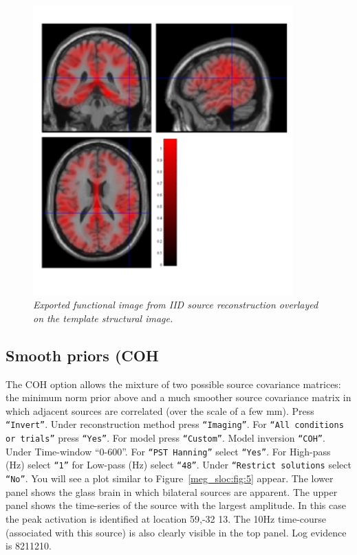 \begin{figure}
\begin{center}
\includegraphics[width=100mm]{meg_sloc/slide4}
\caption{\em Exported functional image from IID source reconstruction overlayed on the template structural image.\label{meg_sloc:fig:4}}
\end{center}
\end{figure}

\subsection{Smooth priors (COH}
The COH option allows the mixture of two possible source covariance matrices: the minimum norm prior above and a much smoother source covariance matrix in which adjacent sources are correlated (over the scale of a few mm). Press \texttt{``Invert''}. Under reconstruction method press \texttt{``Imaging''}. For \texttt{``All conditions or trials''} press \texttt{``Yes''}. For model press \texttt{``Custom''}. Model inversion \texttt{``COH''}. Under Time-window ``0-600''. For \texttt{``PST Hanning''} select \texttt{``Yes''}. For High-pass (Hz) select \texttt{``1''} for Low-pass (Hz) select \texttt{``48''}. Under \texttt{``Restrict solutions} select \texttt{``No''}.   You will see a plot similar to Figure~\ref{meg_sloc:fig:5} appear. The lower panel shows the glass brain in which bilateral sources are apparent. The upper panel shows the time-series of the source with the largest amplitude. In this case the peak activation is identified at location 59,-32 13. The 10Hz time-course (associated with this source) is also clearly visible in the top panel.  Log evidence is 8211210.

